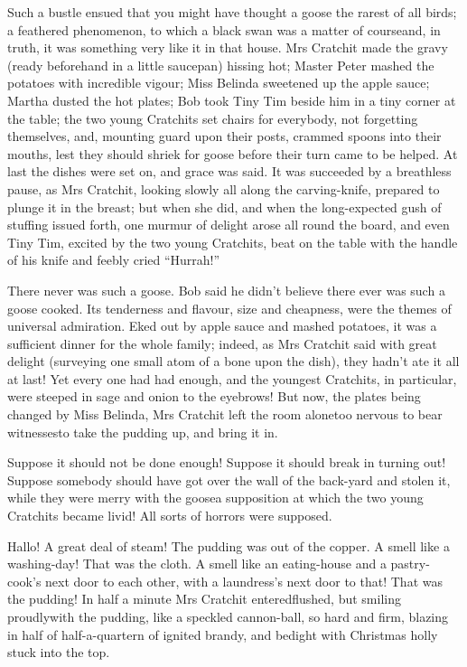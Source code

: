 \documentclass[paper=5.5in:8.5in,BCOR=7mm,twoside,DIV=calc,12pt,usegeometry]{scrbook} %
\begin{document}
Such a bustle ensued that you might have thought a goose the rarest of all birds; a feathered phenomenon, to which a black swan was a matter of course\textemdash and, in truth, it was something very like it in that house. Mrs Cratchit made the gravy (ready beforehand in a little saucepan) hissing hot; Master Peter mashed the potatoes with incredible vigour; Miss Belinda sweetened up the apple sauce; Martha dusted the hot plates; Bob took Tiny Tim beside him in a tiny corner at the table; the two young Cratchits set chairs for everybody, not forgetting themselves, and, mounting guard upon their posts, crammed spoons into their mouths, lest they should shriek for goose before their turn came to be helped. At last the dishes were set on, and grace was said. It was succeeded by a breathless pause, as Mrs Cratchit, looking slowly all along the carving-knife, prepared to plunge it in the breast; but when she did, and when the long-expected gush of stuffing issued forth, one murmur of delight arose all round the board, and even Tiny Tim, excited by the two young Cratchits, beat on the table with the handle of his knife and feebly cried \enquote{Hurrah!}



There never was such a goose. Bob said he didn't believe there ever was such a goose cooked. Its tenderness and flavour, size and cheapness, were the themes of universal admiration. Eked out by apple sauce and mashed potatoes, it was a sufficient dinner for the whole family; indeed, as Mrs Cratchit said with great delight (surveying one small atom of a bone upon the dish), they hadn't ate it all at last! Yet every one had had enough, and the youngest Cratchits, in particular, were steeped in sage and onion to the eyebrows! But now, the plates being changed by Miss Belinda, Mrs Cratchit left the room alone\textemdash too nervous to bear witnesses\textemdash to take the pudding up, and bring it in.



Suppose it should not be done enough! Suppose it should break in turning out! Suppose somebody should have got over the wall of the back-yard and stolen it, while they were merry with the goose\textemdash a supposition at which the two young Cratchits became livid! All sorts of horrors were supposed.

Hallo! A great deal of steam! The pudding was out of the copper. A smell like a washing-day! That was the cloth. A smell like an eating-house and a pastry-cook's next door to each other, with a laundress's next door to that! That was the pudding! In half a minute Mrs Cratchit entered\textemdash flushed, but smiling proudly\textemdash with the pudding, like a speckled cannon-ball, so hard and firm, blazing in half of half-a-quartern of ignited brandy, and bedight with Christmas holly stuck into the top.
\end{document}
